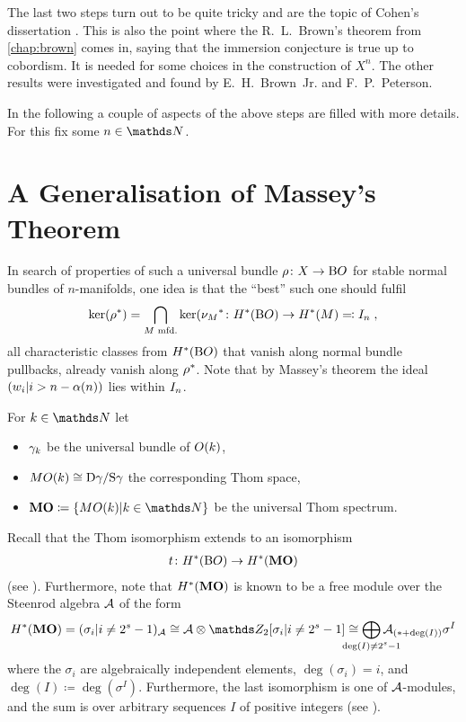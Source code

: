 The last two steps turn out to be quite tricky and are the topic of
Cohen's dissertation \cite{cohen}. This is also the point where the
R.~L.~Brown's theorem from \autoref{chap:brown} comes in, saying
that the immersion conjecture is true up to cobordism.
It is needed for some choices in the construction of $X^n$.
The other results were investigated and found by E.~H.~Brown~Jr. and
F.~P.~Peterson.

In the following a couple of aspects of the above steps are filled
with more details.
For this fix some $n\in\Nat$.

\section*{A Generalisation of Massey's Theorem}
In search of properties of such a universal bundle
$\rho\colon X\to\mathrm{B}O$ for stable normal bundles of $n$-manifolds,
one idea is that the \enquote{best} such one should fulfil
\begin{gather*}
  \ker({\rho}^*)
  = \bigcap_{\text{$M$ mfd.}}
  \ker({\nu_{M}}^*\colon H^*(\mathrm{B}O)\to H^*(M)
  \eqqcolon I_{n}
  \;,
\end{gather*}
\idest all characteristic classes from $H^*(\mathrm{B}O)$ that vanish along
normal bundle pullbacks, already vanish along ${\rho}^*$.
Note that by Massey's theorem the ideal
$\left(w_{i}|i>n-\alpha(n)\right)$ lies within $I_{n}$.

\begin{Not*}
  For $k\in\Nat$ let
  \begin{itemize}
  \item $\gamma_{k}$ be the universal bundle of $O(k)$, 
  \item $MO(k)\cong\mathrm{D}\gamma_{}/\mathrm{S}\gamma_{}$ the corresponding Thom space,
  \item $\MOspec\coloneqq\{\MO(k)|k\in\Nat\}$ be the universal Thom spectrum.
  \end{itemize}
\end{Not*}

\begin{Rem*}
Recall that the Thom isomorphism extends to an isomorphism
\begin{gather*}
  t\colon H^*(\mathrm{B}O) \to H^*(\bm{\mathrm{MO}})
\end{gather*}
(see \forexample \cite{milnor}).
Furthermore, note that $H^*(\bm{\mathrm{MO}})$ is known to be a free module
over the Steenrod algebra $\mathcal{A}$ of the form
\begin{gather*}
  \H^*(\MOspec)
  = (\sigma_i| i\neq 2^s-1)_{\A}
  \cong \A\otimes \Zmod2[\sigma_i|i\neq 2^s-1]
  \cong \bigoplus_{\mathclap{\deg(I)\neq 2^s-1}}
  \A_{(*+\deg(I))}\sigma^I
\end{gather*}
where the $\sigma_i$ are algebraically independent elements,
$\deg(\sigma_i)=i$, and $\deg(I)\coloneqq\deg(\sigma^I)$.
Furthermore, the last isomorphism is one of $\mathcal{A}$-modules, and the sum
is over arbitrary sequences $I$ of positive integers
(see \cite[p.~82]{immersionconj}). %
\end{Rem*}

